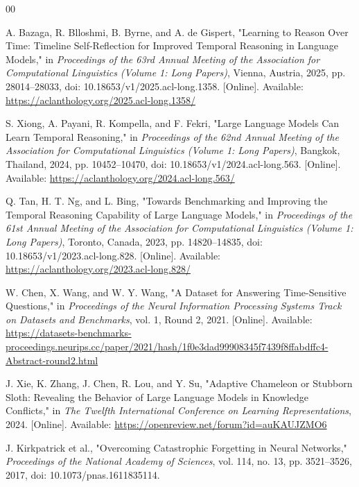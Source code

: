 \documentclass[conference]{IEEEtran}
\begin{document}
\begin{thebibliography}{00}

A. Bazaga, R. Blloshmi, B. Byrne, and A. de Gispert,
"Learning to Reason Over Time: Timeline Self-Reflection for Improved Temporal Reasoning in Language Models,"
in \emph{Proceedings of the 63rd Annual Meeting of the Association for Computational Linguistics (Volume 1: Long Papers)}, Vienna, Austria, 2025, pp. 28014--28033, doi: 10.18653/v1/2025.acl-long.1358. [Online]. Available: \url{https://aclanthology.org/2025.acl-long.1358/}

S. Xiong, A. Payani, R. Kompella, and F. Fekri,
"Large Language Models Can Learn Temporal Reasoning,"
in \emph{Proceedings of the 62nd Annual Meeting of the Association for Computational Linguistics (Volume 1: Long Papers)}, Bangkok, Thailand, 2024, pp. 10452--10470, doi: 10.18653/v1/2024.acl-long.563. [Online]. Available: \url{https://aclanthology.org/2024.acl-long.563/}

Q. Tan, H. T. Ng, and L. Bing,
"Towards Benchmarking and Improving the Temporal Reasoning Capability of Large Language Models,"
in \emph{Proceedings of the 61st Annual Meeting of the Association for Computational Linguistics (Volume 1: Long Papers)}, Toronto, Canada, 2023, pp. 14820--14835, doi: 10.18653/v1/2023.acl-long.828. [Online]. Available: \url{https://aclanthology.org/2023.acl-long.828/}

W. Chen, X. Wang, and W. Y. Wang,
"A Dataset for Answering Time-Sensitive Questions,"
in \emph{Proceedings of the Neural Information Processing Systems Track on Datasets and Benchmarks}, vol. 1, Round 2, 2021. [Online]. Available: \url{https://datasets-benchmarks-proceedings.neurips.cc/paper/2021/hash/1f0e3dad99908345f7439f8ffabdffc4-Abstract-round2.html}

J. Xie, K. Zhang, J. Chen, R. Lou, and Y. Su,
"Adaptive Chameleon or Stubborn Sloth: Revealing the Behavior of Large Language Models in Knowledge Conflicts,"
in \emph{The Twelfth International Conference on Learning Representations}, 2024. [Online]. Available: \url{https://openreview.net/forum?id=auKAUJZMO6}

J. Kirkpatrick et al.,
"Overcoming Catastrophic Forgetting in Neural Networks,"
\emph{Proceedings of the National Academy of Sciences}, vol. 114, no. 13, pp. 3521--3526, 2017, doi: 10.1073/pnas.1611835114.


\end{thebibliography}
\end{document}
